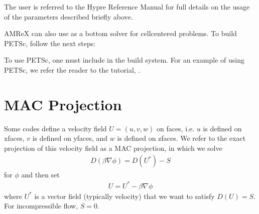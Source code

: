 \documentclass[letterpaper,10pt,english]{sphinxmanual}
\begin{document}
\sphinxAtStartPar
The user is referred to the
 Hypre Reference Manual for full details on the usage of the parameters described briefly above.

\sphinxAtStartPar
AMReX can also use  as a bottom solver for cell\sphinxhyphen{}centered
problems. To build PETSc, follow the next steps:

\begin{sphinxVerbatim}[commandchars=\\\{\}]
   
  
   
      
         
\end{sphinxVerbatim}

\sphinxAtStartPar
To use PETSc, one must include 
in the build system.  For an example of using PETSc, we refer the
reader to the tutorial, .


\section{MAC Projection}
\label{\detokenize{LinearSolvers:mac-projection}}
\sphinxAtStartPar
Some codes define a velocity field \(U = (u,v,w)\) on faces, i.e.
\(u\) is defined on x\sphinxhyphen{}faces, \(v\) is defined on y\sphinxhyphen{}faces,
and \(w\) is defined on z\sphinxhyphen{}faces.   We refer to the exact projection
of this velocity field as a MAC projection, in which we solve
\begin{equation*}
\begin{split}D( \beta \nabla \phi) = D(U^*) - S\end{split}
\end{equation*}
\sphinxAtStartPar
for \(\phi\) and then set
\begin{equation*}
\begin{split}U = U^* - \beta \nabla \phi\end{split}
\end{equation*}
\sphinxAtStartPar
where \(U^*\) is a vector field (typically velocity) that we want to satisfy
\(D(U) = S\).  For incompressible flow,  \(S = 0\).
\end{document}
